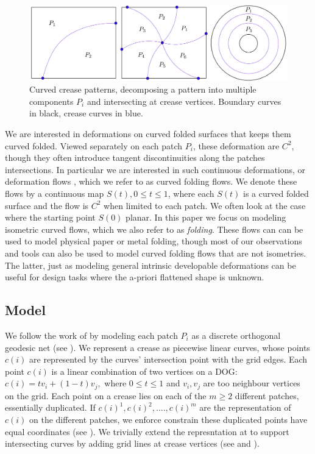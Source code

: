 \begin{figure} [h]
	\centering
	\includegraphics[width=\linewidth]{figures/crease_patterns}
	\caption{Curved crease patterns, decomposing a pattern into multiple components $P_i$ and intersecting at crease vertices. Boundary curves in black, crease curves in blue.}
	\label{fig:crease_pattern}
\end{figure}
We are interested in deformations on curved folded surfaces that keeps them curved folded. Viewed separately on each patch $P_i$, these deformation are $C^2$, though they often introduce tangent discontinuities along the patches intersections. In particular we are interested in such continuous deformations, or deformation flows \cite{rabi2018shape}, which we refer to as curved folding flows. We denote these flows by a continuous map $S(t), 0 \leq t \leq 1$, where each $S(t)$ is a curved folded surface and the flow is $C^2$ when limited to each patch. We often look at the case where the starting point $S(0)$ planar. In this paper we focus on modeling isometric curved flows, which we also refer to as \emph{folding}. These flows can can be used to model physical paper or metal folding, though most of our observations and tools can also be used to model curved folding flows that are not isometries. The latter, just as modeling general intrinsic developable deformations \cite{rabi18,rabi2018shape} can be useful for design tasks where the a-priori flattened shape is unknown.

\subsection{Model} \label{sec:model}
We follow the work of \cite{rabi2018shape} by modeling each patch $P_i$ as a discrete orthogonal geodesic net (see ). We represent a crease as piecewise linear curves, whose points $c(i)$ are represented by the curves' intersection point with the grid edges. Each point $c(i)$ is a linear combination of two vertices on a DOG: $c(i) = t v_i + (1-t)v_j,$ where $0 \leq t \leq 1$ and $v_i,v_j$ are too neighbour vertices on the grid.  Each point on a crease lies on each of the $m \geq 2$ different patches, essentially duplicated. If $c(i)^1,c(i)^2,....,c(i)^m$ are the representation of $c(i)$ on the different patches, we enforce constrain these duplicated points have equal coordinates (see ).
We trivially extend the represntation at \cite{rabi2018shape} to support intersecting curves by adding grid lines at crease vertices (see  and ).

